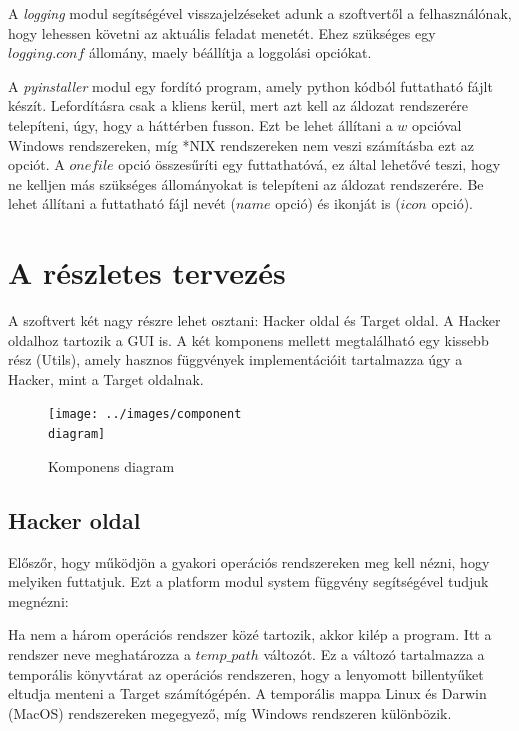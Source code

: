 \documentclass[12pt,a4paper,oneside]{report}
\begin{document}
A \emph{logging} modul segítségével visszajelzéseket adunk a szoftvertől a felhasználónak, hogy lehessen követni az aktuális feladat menetét. Ehez szükséges egy $logging.conf$ állomány, maely béállítja a loggolási opciókat.

A \emph{pyinstaller} modul egy fordító program, amely python kódból futtatható fájlt készít. Lefordításra csak a kliens kerül, mert azt kell az áldozat rendszerére telepíteni, úgy, hogy a háttérben fusson. Ezt be lehet állítani a $w$ opcióval Windows rendszereken, míg *NIX rendszereken nem veszi számításba ezt az opciót. A $onefile$ opció összesűríti egy futtathatóvá, ez által lehetővé teszi, hogy ne kelljen más szükséges állományokat is telepíteni az áldozat rendszerére. Be lehet állítani a futtatható fájl nevét ($name$ opció) és ikonját is ($icon$ opció).



\chapter{A részletes tervezés}\label{sec:plan}

A szoftvert két nagy részre lehet osztani: Hacker oldal és Target oldal. A Hacker oldalhoz tartozik a GUI is. A két komponens mellett megtalálható egy kissebb rész (Utils), amely hasznos függvények implementációit tartalmazza úgy a Hacker, mint a Target oldalnak.
\begin{figure}[H]
\centering
\texttt{[image: ../images/component\\ diagram]}
\caption{Komponens diagram}
\label{fig:compdia}
\end{figure}

\section{Hacker oldal}\label{subsec:server}
Előszőr, hogy működjön a gyakori operációs rendszereken meg kell nézni, hogy melyiken futtatjuk. Ezt a platform modul system függvény segítségével tudjuk megnézni:



Ha nem a három operációs rendszer közé tartozik, akkor kilép a program. Itt a rendszer neve meghatározza a $temp\_path$ változót. Ez a változó tartalmazza a temporális könyvtárat az operációs rendszeren, hogy a lenyomott billentyűket eltudja menteni a Target számítógépén. A temporális mappa Linux és Darwin (MacOS) rendszereken megegyező, míg Windows rendszeren különbözik.
\end{document}
